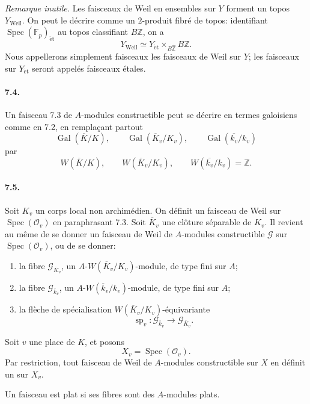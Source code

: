 \documentclass[10pt,letterpaper]{article}
\newcommand{\F}{\mathbb F}
\newcommand{\Gal}{\operatorname{Gal}}
\newcommand{\Spec}{\operatorname{Spec}}
\providecommand{\spc}{\operatorname{sp}}
\providecommand{\Spec}{\operatorname{Spec}}
\providecommand{\Gal}{\operatorname{Gal}}
\providecommand{\spc}{\operatorname{sp}}
\providecommand{\Gal}{\operatorname{Gal}}
\providecommand{\Spec}{\operatorname{Spec}}
\providecommand{\Spec}{\operatorname{Spec}}
\providecommand{\Gal}{\operatorname{Gal}}
\providecommand{\spc}{\operatorname{sp}}
\providecommand{\Gal}{\operatorname{Gal}}
\begin{document}
\emph{Remarque inutile.} Les faisceaux de Weil en ensembles sur \(Y\) forment un topos \(Y_{\mathrm{Weil}}\). On peut le décrire comme un \(2\)-produit fibré de topos: identifiant \(\Spec(\F_p)_{\mathrm{\acute et}}\) au topos classifiant \(B\widehat{\mathbb Z}\), on a
\[
Y_{\mathrm{Weil}}\simeq
Y_{\mathrm{\acute et}}\times_{B\widehat{\mathbb Z}}B\mathbb Z.
\]
Nous appellerons simplement faisceaux les faisceaux de Weil sur \(Y\); les faisceaux sur \(Y_{\mathrm{\acute et}}\) seront appelés faisceaux étales.

\paragraph{7.4.} Un faisceau 7.3 de \(A\)-modules constructible peut se décrire en termes galoisiens comme en 7.2, en remplaçant partout
\[
\Gal(\overline K/K),\qquad
\Gal(\overline K_v/K_v),\qquad
\Gal(\overline{k_v}/k_v)
\]
par
\[
W(\overline K/K),\qquad
W(\overline K_v/K_v),\qquad
W(\overline{k_v}/k_v)=\mathbb Z.
\]

\paragraph{7.5.} Soit \(K_v\) un corps local non archimédien. On définit un faisceau de Weil sur \(\Spec(\mathcal O_v)\) en paraphrasant 7.3. Soit \(\overline K_v\) une clôture séparable de \(K_v\). Il revient au même de se donner un faisceau de Weil de \(A\)-modules constructible \(\mathcal G\) sur \(\Spec(\mathcal O_v)\), ou de se donner:
\begin{enumerate}[label=\alph*)]
\item la fibre \(\mathcal G_{\overline K_v}\), un \(A\)-\(W(\overline K_v/K_v)\)-module, de type fini sur \(A\);
\item la fibre \(\mathcal G_{\overline k_v}\), un \(A\)-\(W(\overline k_v/k_v)\)-module, de type fini sur \(A\);
\item la flèche de spécialisation \(W(\overline K_v/K_v)\)-équivariante
\[
\spc_v:\mathcal G_{\overline k_v}\longrightarrow\mathcal G_{\overline K_v}.
\]
\end{enumerate}
Soit \(v\) une place de \(K\), et posons
\[
X_v=\Spec(\mathcal O_v).
\]
Par restriction, tout faisceau de Weil de \(A\)-modules constructible sur \(X\) en définit un sur \(X_v\).

Un faisceau est plat si ses fibres sont des \(A\)-modules plats.
\end{document}

